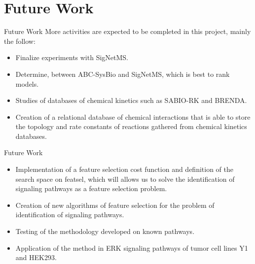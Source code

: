 \documentclass{beamer}
\begin{document}
\section{Future Work}

\begin{frame}{Future Work}
More activities are expected to be completed in this project, mainly the
follow:
\begin{itemize}
    \pause
    \item{} Finalize experiments with SigNetMS.
    \pause
    \item{} Determine, between ABC-SysBio and SigNetMS,
        which is best to rank models.
    \pause
    \item{} Studies of databases of chemical kinetics 
        such as SABIO-RK and BRENDA.
    \pause
    \item{} Creation of a relational database of chemical 
        interactions that is able to store the topology and rate 
        constants of reactions gathered from chemical kinetics 
        databases.
    \end{itemize}
\end{frame}


\begin{frame}{Future Work}
\begin{itemize}
    \item{} Implementation of a feature selection cost
        function and definition of the search space on featsel, which 
        will allows us to solve the identification of signaling pathways 
        as a feature selection problem.
    \pause
    \item{} Creation of new algorithms of feature 
        selection for the problem of identification of signaling 
        pathways.
    \pause
    \item{} Testing of the methodology developed on known
        pathways.
    \pause
    \item{} Application of the method in ERK signaling 
        pathways of tumor cell lines Y1 and HEK293.
\end{itemize}
\end{frame}
\end{document}

